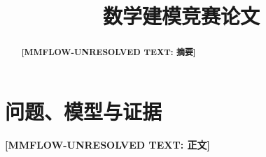\documentclass[UTF8,a4paper,12pt]{ctexart}
\title{数学建模竞赛论文}
\author{}
\date{}
\newcommand{\MMRequiredText}[1]{\textbf{[MMFLOW-UNRESOLVED TEXT: #1]}}
\begin{document}
\maketitle
\begin{abstract}
\MMRequiredText{摘要}
\end{abstract}
\section{问题、模型与证据}
\MMRequiredText{正文}
\end{document}
